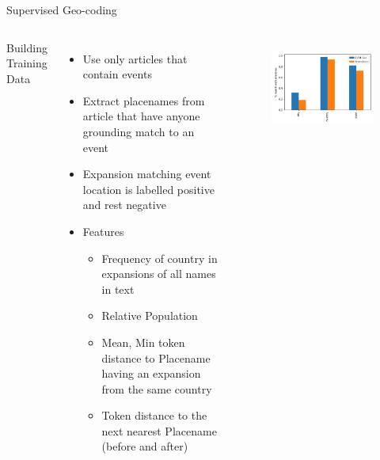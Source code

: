 \begin{frame}{Supervised Geo-coding}

\begin{columns}
Building Training Data

    \begin{itemize}
    \small
        \item Use only articles that contain events
        \item Extract placenames from article that have anyone grounding match to an event
        \item Expansion matching event location is labelled positive and rest negative
        \item Features
        \begin{itemize}
            \item Frequency of country in expansions of all names in text
            \item Relative Population 
            \item Mean, Min token distance to Placename having an expansion from the same country
            \item Token distance to the next nearest Placename (before and after)
        \end{itemize}
    \end{itemize}


\begin{figure}
    \centering
    \includegraphics[width=\textwidth]{Problem2/figures/Geo_metrics.png}
    \label{fig:my_label}
\end{figure}
\end{columns}

\end{frame}

